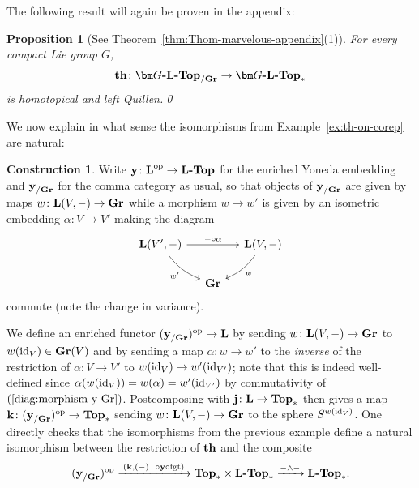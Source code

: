 \documentclass[reqno]{memo-l}
\theoremstyle{mythm}
\newtheorem{prop}[thm]{Proposition}
\theoremstyle{definition}
\newtheorem{constr}[thm]{Construction}
\numberwithin{equation}{section}
\newcommand{\cat}[1]{\textbf{\textup{#1}}}
\newcommand{\op}{{\textup{op}}}
\newcommand{\id}{\textup{id}}
\newcommand{\fgt}{\textup{fgt}}
\let\smashp=\wedge
\begin{document}
The following result will again be proven in the appendix:

\begin{prop}[See Theorem~\ref{thm:Thom-marvelous-appendix}(1)]\label{prop:thom-space-marvelous}
    For every compact Lie group $G$,
    \[
        \cat{th}\colon\cat{$\bm G$-$\cat{L}$-Top}_{/\cat{Gr}}\to\cat{$\bm G$-$\cat{L}$-Top}_*
    \]
    is homotopical and left Quillen.\qed
\end{prop}

We now explain in what sense the isomorphisms from Example~\ref{ex:th-on-corep} are natural:

\begin{constr}\label{constr:th-on-corep}
    Write $\cat{y}\colon\cat{L}^\op\to\cat{$\cat{L}$-Top}$ for the enriched Yoneda embedding and $\cat{y}_{/\cat{Gr}}$ for the comma category as usual, so that objects of $\cat{y}_{/\cat{Gr}}$ are given by maps $w\colon\cat{L}(V,-)\to\cat{Gr}$ while a morphism $w\to w'$ is given by an isometric embedding $\alpha\colon V\to V'$ making the diagram    
    \begin{equation}\label{diag:morphism-y-Gr}
        \begin{tikzcd}[column sep=small]
            \cat{L}(V',-)\arrow[rr,"-\circ\alpha"]\arrow[dr, bend right=15pt,"w'"'] && \cat{L}(V,-)\arrow[dl, bend left=15pt,"w"]\\
            & \cat{Gr}
        \end{tikzcd}
    \end{equation}
    commute (note the change in variance).

    We define an enriched functor $(\cat{y}_{/\cat{Gr}})^\op\to\cat{L}$ by sending $w\colon\cat{L}(V,-)\to\cat{Gr}$ to $w(\id_V)\in\cat{Gr}(V)$ and by sending a map $\alpha\colon w\to w'$ to the \emph{inverse} of the restriction of $\alpha\colon V\to V'$ to $w(\id_{V})\to w'(\id_{V'})$; note that this is indeed well-defined since $\alpha(w(\id_V))=w(\alpha)=w'(\id_{V'})$ by commutativity of $(\ref{diag:morphism-y-Gr})$. Postcomposing with $\cat{j}\colon\cat{L}\to\cat{Top}_*$ then gives a map $\cat{k}\colon(\cat{y}_{/\cat{Gr}})^\op\to\cat{Top}_*$ sending $w\colon\cat{L}(V,-)\to\cat{Gr}$ to the sphere $S^{w(\id_V)}$. One directly checks that the isomorphisms from the previous example define a natural isomorphism between the restriction of $\cat{th}$ and the composite
    \begin{equation}\label{diag:thom-space-on-yoneda}
        (\cat{y}_{/\cat{Gr}})^\op\xrightarrow{\;(\cat{k},(-)_+\circ\cat{y}\circ\fgt)\;}
        \cat{Top}_*\times\cat{$\cat{L}$-Top}_*\xrightarrow{-\smashp-}
        \cat{$\cat{L}$-Top}_*.
    \end{equation}
\end{constr}
\end{document}
